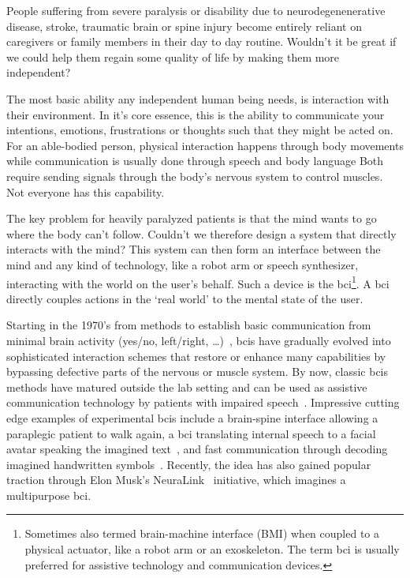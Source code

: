 
People suffering from severe paralysis or disability due to
neurodegenenerative disease, stroke, traumatic brain or spine injury
become entirely reliant on caregivers or family members in their day to day
routine.
Wouldn't it be great if we could help them regain some quality of life by
making them more independent?

The most basic ability any independent human being needs, is interaction with
their environment.
In it's core essence, this is the ability to communicate your intentions,
emotions, frustrations or thoughts such that they might be acted on.
For an able-bodied person, physical interaction happens through body movements
while communication is usually done through speech and body language
Both require sending signals through the body's nervous system to control
muscles.
Not everyone has this capability.

The key problem for heavily paralyzed patients is that the mind wants to go
where the body can't follow.
Couldn't we therefore design a system that directly interacts with the mind?
This system can then form an interface between the mind and any kind of
technology, like a robot arm or speech synthesizer, interacting with the world
on the user's behalf.
Such a device is the \ac{bci}\footnote{Sometimes also
termed brain-machine interface (BMI) when coupled to a physical actuator, like
a robot arm or an exoskeleton. The term \ac{bci} is usually preferred for
assistive technology and communication devices.}.
A \ac{bci} directly couples actions in the `real world' to the mental state of
the user.

Starting in the 1970's from methods to establish basic communication from
minimal brain activity (yes/no, left/right, \ldots)~\cite{Wolpaw2002}, \acp{bci} have gradually evolved
into sophisticated interaction schemes that restore or enhance many capabilities
by bypassing defective parts of the nervous or muscle system.
By now, classic \acp{bci} methods have matured outside the lab setting and can be
used as assistive communication technology by patients with impaired
speech~\cite{Wolpaw2018}.
Impressive cutting edge examples of experimental \acp{bci} include a brain-spine
interface allowing a paraplegic patient to walk again\cite{Lorach2023},
a \ac{bci} translating internal speech to a facial avatar speaking the imagined
text~\cite{Metzger2023}, and fast communication through decoding imagined
handwritten symbols~\cite{Willett2021}.
Recently, the idea has also gained popular traction through Elon Musk's
NeuraLink~\cite{Musk2019} initiative, which imagines a multipurpose \ac{bci}.

